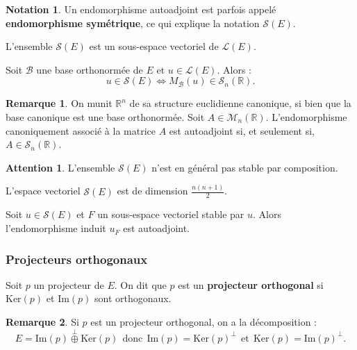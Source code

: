 \documentclass[french]{article}
\newcommand{\R}{\mathbb{R}}
\renewcommand{\ker}{\text{Ker}}
\theoremstyle{plain}
\theoremstyle{definition}
\newtheorem*{rmq}{Remarque}
\newtheorem*{notation}{Notation}
\newtheorem*{attention}{Attention}
\theoremstyle{remark}
\begin{document}
\begin{notation}
	Un endomorphisme autoadjoint est parfois appelé \textbf{endomorphisme symétrique}, ce qui explique la notation $\mathcal{S}(E)$.
\end{notation}

\begin{prop}
	L'ensemble $\mathcal{S}(E)$ est un sous-espace vectoriel de $\mathcal{L}(E)$.
\end{prop}

\begin{prop}
	Soit $\mathcal{B}$ une base orthonormée de $E$ et $u\in\mathcal{L}(E)$. Alors : $$u\in \mathcal{S}(E)\iff M_\mathcal{B}(u)\in\mathcal{S}_n(\R).$$
\end{prop}

\begin{rmq}
	On munit $\R^n$ de sa structure euclidienne canonique, si bien que la base canonique est une base orthonormée. Soit $A\in\mathcal{M}_n(\R)$. L'endomorphisme canoniquement associé à la matrice $A$ est autoadjoint si, et seulement si, $A\in\mathcal{S}_n(\R)$.
\end{rmq}

\begin{attention}
	L'ensemble $\mathcal{S}(E)$ n'est en général pas stable par composition.
\end{attention}

\begin{cor}
	L'espace vectoriel $\mathcal{S}(E)$ est de dimension $\displaystyle\frac{n(n+1)}{2}$.
\end{cor}

\begin{lem}
	Soit $u\in\mathcal{S}(E)$ et $F$ un sous-espace vectoriel stable par $u$. Alors l'endomorphisme induit $u_F$ est autoadjoint.
\end{lem}

\subsubsection*{Projecteurs orthogonaux}

\begin{dfn}
	Soit $p$ un projecteur de $E$. On dit que $p$ est un \textbf{projecteur orthogonal} si $\ker(p)$ et $\text{Im}(p)$ sont orthogonaux.
\end{dfn}

\begin{rmq}
	Si $p$ est un projecteur orthogonal, on a la décomposition : $$E=\text{Im}(p)\overset{\bot}{\oplus}\ker(p)\ \ \text{donc} \ \ \text{Im}(p)=\ker(p)^\bot\ \ \text{et}\ \ \ker(p)=\text{Im}(p)^\bot.$$
\end{rmq}
\end{document}

